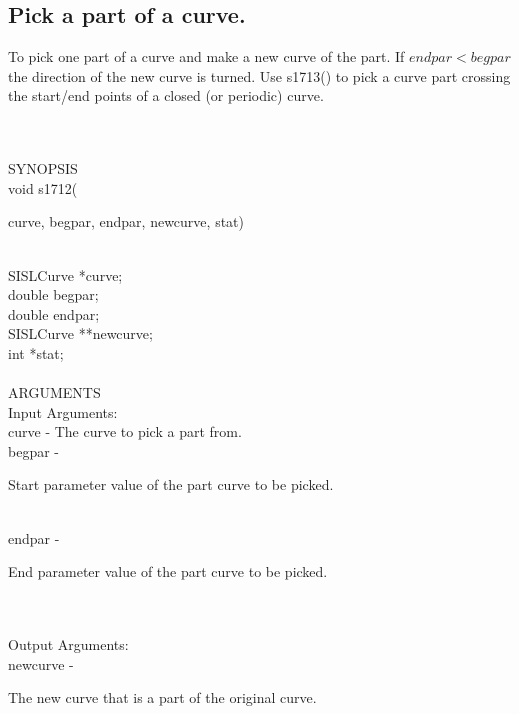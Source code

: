 \subsection{Pick a part of a curve.}
\begin{minipg1}
  To pick one part of a curve and make a new curve of the part. If
  $endpar<begpar$ the direction of the new curve is turned.
  Use s1713() to pick a curve part crossing the start/end points of a
  closed (or periodic) curve.
\end{minipg1} \\ \\
SYNOPSIS\\
        \>void s1712(\begin{minipg3}
        {\fov curve}, {\fov begpar}, {\fov endpar}, {\fov newcurve}, {\fov stat})
                \end{minipg3}\\[0.3ex]
                \>\>    SISLCurve       \>      *{\fov curve};\\
                \>\>    double  \>      {\fov begpar};\\
                \>\>    double  \>      {\fov endpar};\\
                \>\>    SISLCurve       \>      **{\fov newcurve};\\
                \>\>    int     \>      *{\fov stat};\\
\\
ARGUMENTS\\
        \>Input Arguments:\\
        \>\>    {\fov curve}    \> - \> The curve to pick a part from.\\
        \>\>    {\fov begpar}   \> - \> \begin{minipg2}
                                Start parameter value of the part curve
                                to be picked.
                                \end{minipg2}\\
        \>\>    {\fov endpar}   \> - \> \begin{minipg2}
                                End parameter value of the part curve
                                to be picked.
                                \end{minipg2}\\
\\
        \>Output Arguments:\\
        \>\>    {\fov newcurve}\> - \>\begin{minipg2}
                                The new curve that is a part of the original curve.
                                \end{minipg2}\\
